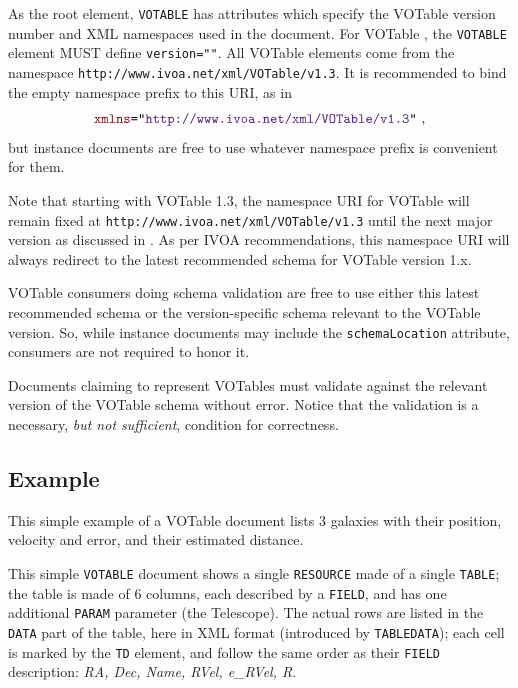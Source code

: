 \documentclass[11pt,a4paper]{ivoa}
\let\fg=\color
\def\attr#1{{\tt{\fg{DarkRed}#1}}}
\def\elem#1{{\tt{\fg{DarkRed}#1}}}
\def\attrval#1#2{{\tt{\fg{DarkRed}#1}="{\fg{DarkPurple}#2}"}}
\begin{document}
As the root element, \elem{VOTABLE} has attributes which specify the VOTable version
number and XML namespaces used in the document. For VOTable \ivoaDocversion{}, the \elem{VOTABLE}
element MUST define \attrval{version}{\ivoaDocversion{}}.  All VOTable \ivoaDocversion{} elements come from the
namespace \nolinkurl{http://www.ivoa.net/xml/VOTable/v1.3}.  It is recommended to bind
the empty namespace prefix to this URI, as in
$$\hbox{\attrval{xmlns}{http://www.ivoa.net/xml/VOTable/v1.3}~,}$$ but instance
documents are free to use whatever namespace prefix is convenient for them.

Note that starting with VOTable 1.3, the namespace URI for VOTable will
remain fixed at \nolinkurl{http://www.ivoa.net/xml/VOTable/v1.3}
until the next major version as discussed in \citet{2018ivoa.spec.0529H}.
As per IVOA
recommendations, this namespace URI will always redirect to the latest
recommended schema for VOTable version 1.x.

VOTable consumers doing schema validation
are free to use either this latest recommended schema or the version-specific
schema relevant to the VOTable version. So, while instance documents
may include the \attr{schemaLocation} attribute, consumers are not required
to honor it.

Documents claiming to represent VOTables must validate against the
relevant version of the VOTable schema without error.  Notice that the
validation is a necessary, {\em but not sufficient}, condition for correctness.

\subsection{Example}

This simple example of a VOTable document lists 3 galaxies with their
position, velocity and error, and their estimated distance.

\label{example1}
\begingroup\small

\endgroup

This simple \elem{VOTABLE} document shows a single \elem{RESOURCE} made of a single \elem{TABLE};
the table is made of 6 columns, each described by a \elem{FIELD}, and has
one additional \elem{PARAM} parameter (the Telescope). The actual rows are
listed in the \elem{DATA} part of the table, here in  XML format
(introduced by \elem{TABLEDATA}); each cell is marked by the \elem{TD} element,
and follow the same order as their \elem{FIELD} description:
{\sl RA, Dec, Name, RVel, e\_RVel, R}.
\end{document}
